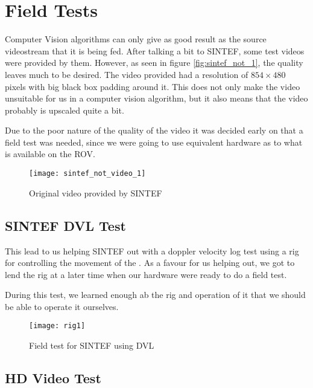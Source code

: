 
\chapter{Field Tests}\label{ch:field_test}

Computer Vision algorithms can only give as good result as the source videostream that it is 
being fed. After talking a bit to SINTEF, some test videos were provided by them. However, as seen in figure 
\vref{fig:sintef_not_1}, the quality leaves much to be desired. The video provided had a resolution 
of $854 \times 480$ pixels with big black box padding around it. This does not only make 
the video unsuitable for us in a computer vision algorithm, but it also means that the video 
probably is upscaled quite a bit.

Due to the poor nature of the quality of the video it was decided early on that 
a field test was needed, since we were going to use equivalent hardware as to what is available on the ROV. 

\begin{figure}[htbp]
	\centering
	\texttt{[image: sintef\_not\_video\_1]}
	\caption{Original video provided by SINTEF}
	\label{fig:sintef_not_1}
\end{figure}

\section{SINTEF DVL Test}
This lead to us helping SINTEF out with a doppler velocity log test using a rig for controlling 
the movement of the . As a favour for us helping out, we 
got to lend the rig at a later time when our hardware were ready to do a field test. 

During this test, we learned enough ab the rig and operation of it that we should be able to operate 
it ourselves.

\begin{figure}[htbp]
	\centering
	\texttt{[image: rig1]}
	\caption{Field test for SINTEF using DVL}
	\label{fig:test_dvl}
\end{figure}

\section{HD Video Test}

